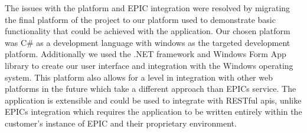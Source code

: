 \documentclass[onecolumn, draftclsnofoot,10pt, compsoc]{IEEEtran}
\begin{document}
The issues with the platform and EPIC integration were resolved by migrating the final platform of the project to our platform used to demonstrate basic functionality that could be achieved with the application.
Our chosen platform was C\# as a development language with windows as the targeted development platform.
Additionally we used the .NET framework and Windows Form App library to create our user interface and integration with the Windows operating system.
This platform also allows for a level in integration with other web platforms in the future which take a different approach than EPICs service.
The application is extensible and could be used to integrate with RESTful apis, unlike EPICs integration which requires the application to be written entirely within the customer's instance of EPIC and their proprietary environment.
\end{document}
